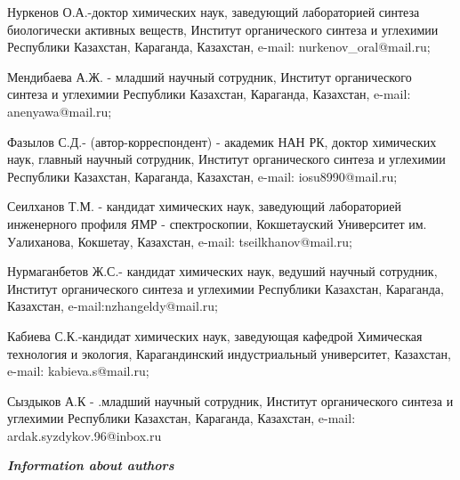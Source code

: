 \begin{noparindent}
Нуркенов О.А.-доктор химических наук, заведующий лабораторией синтеза
биологически активных веществ, Институт органического синтеза и
углехимии Республики Казахстан, Караганда, Казахстан, e-mail:
nurkenov\_oral@mail.ru;

Мендибаева А.Ж. - младший научный сотрудник, Институт органического
синтеза и углехимии Республики Казахстан, Караганда, Казахстан, e-mail:
anenyawa@mail.ru;

Фазылов С.Д.- (автор-корреспондент) - академик НАН РК, доктор химических
наук, главный научный сотрудник, Институт органического синтеза и
углехимии Республики Казахстан, Караганда, Казахстан, e-mail:
iosu8990@mail.ru;

Сеилханов Т.М. - кандидат химических наук, заведующий лабораторией
инженерного профиля ЯМР - спектроскопии, Кокшетауский Университет им.
Уалиханова, Кокшетау, Казахстан, e-mail: tseilkhanov@mail.ru;

Нурмаганбетов Ж.С.- кандидат химических наук, ведуший научный сотрудник,
Институт органического синтеза и углехимии Республики Казахстан,
Караганда, Казахстан, e-mail:nzhangeldy@mail.ru;

Кабиева С.К.-кандидат химических наук, заведующая кафедрой Химическая
технология и экология, Карагандинский индустриальный университет,
Казахстан, e-mail: kabieva.s@mail.ru;

Сыздыков А.К - .младший научный сотрудник, Институт органического
синтеза и углехимии Республики Казахстан, Караганда, Казахстан, e-mail:
ardak.syzdykov.96@inbox.ru
\end{noparindent}

\emph{{\bfseries Information about authors}}

